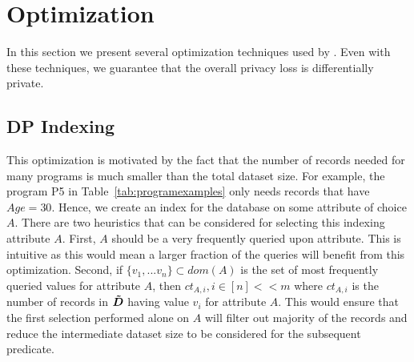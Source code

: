 \section{Optimization}\label{sec:optimization}
In this section we present several optimization techniques used by \system. Even with these techniques, we guarantee that the overall privacy loss is differentially private.

\subsection{DP Indexing} 
This optimization is motivated by the fact that the number of records needed for many programs is much smaller than the total dataset size.  For example, the program  P5 in Table~\ref{tab:programexamples} only needs records that have $Age=30$. Hence, we create an index for the database on some attribute of choice $A$. There are two heuristics that can be considered for selecting this indexing attribute $A$. First, $A$ should be a very frequently queried upon attribute. This is intuitive as this would mean a larger fraction of the queries will benefit from this optimization. Second, if $\{v_1,...v_n\} \subset dom(A)$ is the set of most frequently queried values for attribute $A$, then $ct_{A,i}, i \in [n] << m$ where $ct_{A,i}$ is the number of records in $\boldsymbol{\tilde{D}}$ having value $v_i$ for attribute $A$. This would ensure that the first selection performed alone on $A$ will filter out majority of the records and reduce the intermediate dataset size to be considered for the subsequent predicate. 


